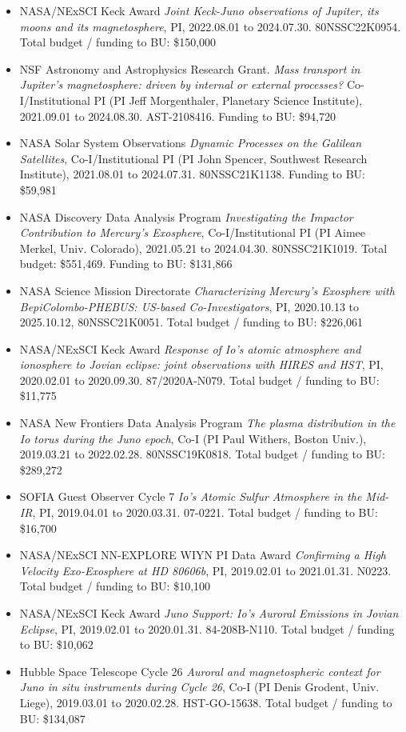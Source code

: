 \documentclass[12pt]{report}
\begin{document}
\begin{itemize}
 \item NASA/NExSCI Keck Award {\it Joint Keck-Juno observations of Jupiter, its moons and its magnetosphere}, PI, 2022.08.01 to 2024.07.30. 80NSSC22K0954. Total budget / funding to BU: \$150,000
 \item NSF Astronomy and Astrophysics Research Grant. {\it Mass transport in Jupiter's magnetosphere: driven by internal or external processes?} Co-I/Institutional PI (PI Jeff Morgenthaler, Planetary Science Institute), 2021.09.01 to 2024.08.30. AST-2108416. Funding to BU: \$94,720
 \item NASA Solar System Observations {\it Dynamic Processes on the Galilean Satellites}, Co-I/Institutional PI (PI John Spencer, Southwest Research Institute), 2021.08.01 to 2024.07.31. 80NSSC21K1138. Funding to BU: \$59,981
 \item NASA Discovery Data Analysis Program {\it Investigating the Impactor Contribution to Mercury's Exosphere}, Co-I/Institutional PI (PI Aimee Merkel, Univ. Colorado), 2021.05.21 to 2024.04.30. 80NSSC21K1019. Total budget: \$551,469. Funding to BU: \$131,866
 \item NASA Science Mission Directorate {\it Characterizing Mercury’s Exosphere with BepiColombo-PHEBUS: US-based Co-Investigators}, PI, 2020.10.13 to 2025.10.12, 80NSSC21K0051. Total budget / funding to BU: \$226,061
 \item NASA/NExSCI Keck Award {\it Response of Io's atomic atmosphere and ionosphere to Jovian eclipse: joint observations with HIRES and HST}, PI, 2020.02.01 to 2020.09.30. 87/2020A-N079. Total budget / funding to BU: \$11,775
 \item NASA New Frontiers Data Analysis Program {\it The plasma distribution in the Io torus during the Juno epoch}, Co-I (PI Paul Withers, Boston Univ.), 2019.03.21 to 2022.02.28. 80NSSC19K0818. Total budget / funding to BU: \$289,272
 \item SOFIA Guest Observer Cycle 7 {\it Io's Atomic Sulfur Atmosphere in the Mid-IR}, PI, 2019.04.01 to 2020.03.31. 07-0221. Total budget / funding to BU: \$16,700
 \item NASA/NExSCI NN-EXPLORE WIYN PI Data Award {\it Confirming a High Velocity Exo-Exosphere at HD 80606b}, PI, 2019.02.01 to 2021.01.31. N0223. Total budget / funding to BU: \$10,100
 \item NASA/NExSCI Keck Award {\it Juno Support: Io's Auroral Emissions in Jovian Eclipse}, PI, 2019.02.01 to 2020.01.31. 84-208B-N110. Total budget / funding to BU: \$10,062
 \item Hubble Space Telescope Cycle 26 {\it Auroral and magnetospheric context for Juno in situ instruments during Cycle 26}, Co-I (PI Denis Grodent, Univ. Liege), 2019.03.01 to 2020.02.28. HST-GO-15638. Total budget / funding to BU: \$134,087

\end{itemize}
\end{document}
